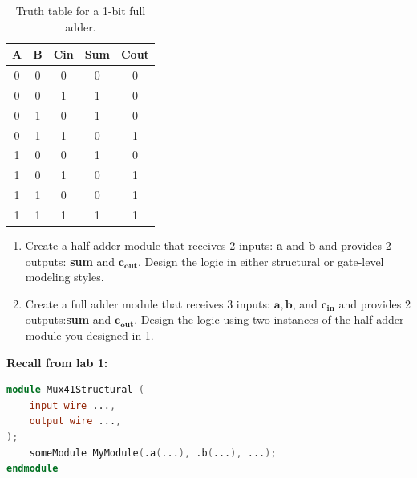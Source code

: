 \documentclass[12pt]{labmanual}
\begin{document}
\begin{table}[H]
    \centering
    \begin{tabular}{ccc|cc}
        \toprule
        A & B & Cin & Sum & Cout \\
        \midrule
        0 & 0 & 0 & 0 & 0 \\
        0 & 0 & 1 & 1 & 0 \\
        0 & 1 & 0 & 1 & 0 \\
        0 & 1 & 1 & 0 & 1 \\
        1 & 0 & 0 & 1 & 0 \\
        1 & 0 & 1 & 0 & 1 \\
        1 & 1 & 0 & 0 & 1 \\
        1 & 1 & 1 & 1 & 1 \\
        \bottomrule
    \end{tabular}
    \caption{Truth table for a 1-bit full adder.}
    \label{tab:full_adder_tt}
\end{table}
\clearpage
\begin{question}
\begin{enumerate}
    \item  Create a half adder module that receives 2 inputs: $\mathbf{a}$ and $\mathbf{b}$ and provides 2 outputs: \textbf{sum} and $\textbf{c}_\textbf{out}$. Design the logic in either structural or gate-level modeling styles.
    \item Create a full adder module that receives 3 inputs: $\mathbf{a},\mathbf{b}$, and $\textbf{c}_\textbf{in}$ and provides 2 outputs:\hspace{1em}\textbf{sum} and $\textbf{c}_\textbf{out}$. Design the logic using two instances of the half adder module you designed in 1.
\end{enumerate}
\end{question}
\noindent
\textbf{Recall from lab 1:}
\begin{lstlisting}[language=Verilog]
module Mux41Structural (
    input wire ...,
    output wire ..., 
);
    someModule MyModule(.a(...), .b(...), ...);
endmodule
\end{lstlisting}
\end{document}
